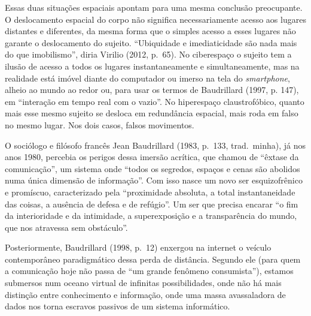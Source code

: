 Essas duas situações espaciais apontam para uma mesma conclusão
preocupante. O deslocamento espacial do corpo não significa
necessariamente acesso aos lugares distantes e diferentes, da mesma
forma que o simples acesso a esses lugares não garante o deslocamento do
sujeito. ``Ubiquidade e imediaticidade são nada mais do que \label{ubiquidade}
imobilismo'', diria Virilio (2012, p.~65). No ciberespaço o sujeito tem
a ilusão de acesso a todos os lugares instantaneamente e
simultaneamente, mas na realidade está imóvel diante do computador ou
imerso na tela do \emph{smartphone}, alheio ao mundo ao redor ou, para usar os termos de Baudrillard (1997, p. 147), em ``interação em tempo real com o vazio''. No
hiperespaço claustrofóbico, quanto mais esse mesmo sujeito se desloca em
redundância espacial, mais roda em falso no mesmo lugar. Nos dois casos,
falsos movimentos.

O sociólogo e filósofo francês Jean Baudrillard (1983, p.~133, trad.~minha), já nos anos \label{internet} 1980, percebia os perigos dessa imersão acrítica, que chamou de ``êxtase da comunicação'', um sistema onde ``todos os segredos, espaços e cenas são abolidos numa única dimensão de informação''. Com isso nasce um novo ser esquizofrênico e promíscuo, caracterizado pela ``proximidade absoluta, a total instantaneidade das coisas, a ausência de defesa e de refúgio''. Um ser que precisa encarar ``o fim da interioridade e da intimidade, a superexposição e a transparência do mundo, que nos atravessa sem obstáculo''.

Posteriormente, Baudrillard (1998, p.~12) enxergou na internet o veículo contemporâneo paradigmático dessa perda de distância. Segundo ele (para quem a comunicação hoje não passa de ``um grande fenômeno consumista''), estamos submersos num oceano virtual de infinitas possibilidades, onde não há mais distinção entre conhecimento e informação, onde uma massa avassaladora de dados nos torna escravos passivos de um sistema informático.

